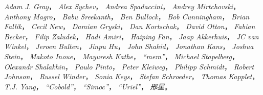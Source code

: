\emph{Adam J. Gray}，
\emph{Alex Sychev}，
\emph{Andrea Spadaccini}，
\emph{Andrey Mirtchovski}，
\emph{Anthony Magro}，
\emph{Babu Sreekanth}，
\emph{Ben Bullock}，
\emph{Bob Cunningham}，
\emph{Brian Fallik}，
\emph{Cecil New}，
\emph{Damian Gryski}，
\emph{Dan Kortschak}，
\emph{David Otton}，
\emph{Fabian Becker}，
\emph{Filip Zaludek}，
\emph{Hadi Amiri}，
\emph{Haiping Fan}，
\emph{Jaap Akkerhuis}，
\emph{JC van Winkel}，
\emph{Jeroen Bulten}，
\emph{Jinpu Hu}，
\emph{John Shahid}，
\emph{Jonathan Kans}，
\emph{Joshua Stein}，
\emph{Makoto Inoue}，
\emph{Mayuresh Kathe}，
\emph{``mem''}，
\emph{Michael Stapelberg}，
\emph{Olexandr Shalakhin}，
\emph{Paulo Pinto}，
\emph{Peter Kleiweg}，
\emph{Philipp Schmidt}，
\emph{Robert Johnson}，
\emph{Russel Winder}，
\emph{Sonia Keys}，
\emph{Stefan Schroeder}，
\emph{Thomas Kapplet}，
\emph{T.J. Yang}，
\emph{``Cobold''}，
\emph{``Simoc''}，
\emph{``Uriel''}，
\emph{邢星}。
